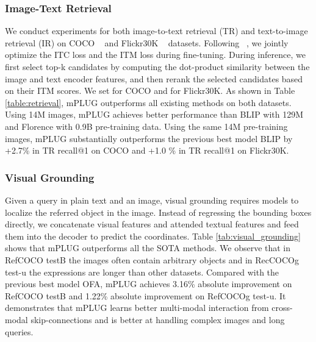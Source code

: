 \documentclass[11pt]{article}
\newcommand{\modelname}{mPLUG }
\begin{document}
\subsubsection{Image-Text Retrieval} We conduct experiments for both image-to-text retrieval (TR) and text-to-image retrieval (IR) on COCO ~\cite{lin2014microsoft} and Flickr30K ~\cite{plummer2015flickr30k} datasets. Following ~\cite{li2021align, li2022blip}, we jointly optimize the ITC loss and the ITM loss during fine-tuning. During inference, we first select top-k candidates by computing the dot-product similarity between the image and text encoder features, and then rerank
the selected candidates based on their ITM scores. We set  for COCO and  for Flickr30K. As shown in Table \ref{table:retrieval}, \modelname outperforms all existing methods on both datasets. Using
14M images, \modelname achieves better performance than
BLIP with 129M and Florence with 0.9B pre-training data. Using the same 14M pre-training images, \modelname substantially outperforms the previous best model BLIP by +2.7\% in TR recall@1 on COCO and +1.0 \% in TR recall@1 on Flickr30K. 


\subsubsection{Visual Grounding} Given a query in plain text and an image, visual grounding requires models to localize the referred object in the image. Instead of regressing the bounding boxes directly, we concatenate visual features and attended textual features and feed them into the decoder to predict the coordinates. Table \ref{tab:visual_grounding} shows that \modelname outperforms all the SOTA methods. We observe that in RefCOCO testB the images often contain arbitrary objects and in RecCOCOg test-u the expressions are longer than other datasets. Compared with the previous best model OFA, \modelname achieves 3.16\% absolute improvement on RefCOCO testB and 1.22\% absolute improvement on RefCOCOg test-u. It demonstrates that \modelname learns better multi-modal interaction from cross-modal skip-connections and is better at handling complex images and long queries.
\end{document}
